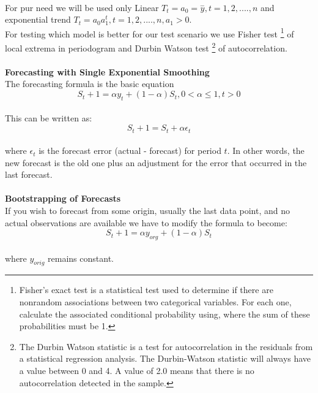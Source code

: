 \\
For pur need we will be used only Linear $T_t = a_0 = \overset{-}{y}, t = 1,2, ...., n$ and exponential trend
$T_t = a_{0}a_1^t, t = 1,2,....,n, a_1 > 0$.
\\
For testing which model is better for our test scenario we use Fisher test \footnote{Fisher's exact test is a statistical test
used to determine if there are nonrandom associations between two categorical variables.
For each one, calculate the associated conditional probability using, where the sum of these probabilities must be 1.} of local extrema
in periodogram and Durbin Watson test \footnote{The Durbin Watson statistic is a test for autocorrelation in the residuals
from a statistical regression analysis.
The Durbin-Watson statistic will always have a value between 0 and 4.
A value of 2.0 means that there is no autocorrelation detected in the sample.} of autocorrelation.\\
\\
\textbf{Forecasting with Single Exponential Smoothing} \label{subsec:statistics_forecast}
\\
The forecasting formula is the basic equation
\begin{equation} \label{eq:21}
S_t+1 = \alpha y_t+(1−\alpha)S_t, 0< \alpha \leq 1,t>0
\end{equation}
\\
This can be written as:
\begin{equation} \label{eq:22}
S_t+1=S_t+\alpha \epsilon_t
\end{equation}
\\
where $\epsilon_t$ is the forecast error (actual - forecast) for period $t$.
In other words, the new forecast is the old one plus an adjustment for the error that occurred in the last forecast.\\
\\
\textbf{Bootstrapping of Forecasts}\\
If you wish to forecast from some origin, usually the last data point, and no actual observations are available
we have to modify the formula to become:
\\
\begin{equation} \label{eq:23}
S_t+1 = \alpha y_{org}+(1−\alpha)S_t
\end{equation}
\\
where $y_{orig}$ remains constant.
